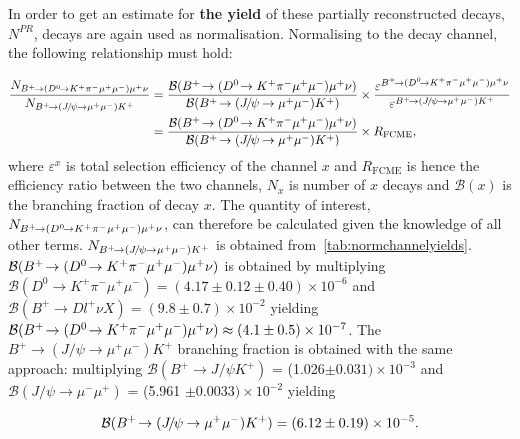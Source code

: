 In order to get an estimate for \textbf{the yield} of these partially reconstructed decays, $N^{PR}$, \bjpsimumuk decays are again used as normalisation. Normalising to the \bjpsimumuk decay channel, the following relationship must hold: 

\begin{equation}
\begin{split}
\frac{N_{\pr}}{N_{\bjpsimumuk}}&= \frac{\mathcal{B}(\pr)}{\mathcal{B}(\bjpsimumuk)} \times \frac{\varepsilon^{\pr}}{\varepsilon^{\bjpsimumuk}} \\
&=\frac{\mathcal{B}(\pr)}{\mathcal{B}(\bjpsimumuk)} \times R_{\mathrm{FCME}},
\end{split}
\end{equation}
	where $\varepsilon^{x}$ is total selection efficiency of the channel $x$ and $R_{\mathrm{FCME}}$ is hence the efficiency ratio between the two channels, $N_{x}$ is number of $x$ decays and $\mathcal{B}(x)$ is the branching fraction of decay $x$. The quantity of interest, $N_{{{{B}^+}}\!\rightarrow ({{D}^0}\!\rightarrow {\ensuremath{{K}^+}}{\ensuremath{{\pi}^-}}{\ensuremath{\mu^+\mu^-}}){\mu^+}\nu}$, can therefore be calculated given the knowledge of all other terms. $N_{{{{B}^+}}\!\rightarrow ({{J\mskip -3mu/\mskip -2mu\psi\mskip 2mu}}\!\rightarrow {\ensuremath{\mu^+\mu^-}}){{K}^+}}$ is obtained from~\autoref{tab:normchannelyields}. $\mathcal{B}({{{B}^+}}\!\rightarrow ({{D}^0}\!\rightarrow {\ensuremath{{K}^+}}{\ensuremath{{\pi}^-}}{\ensuremath{\mu^+\mu^-}}){\mu^+}\nu)$ is obtained by multiplying $\mathcal{B}(D^{0} \rightarrow K^+ \pi^- \mu^+ \mu^{-}) = (4.17\pm0.12\pm0.40)\times 10^{-6}$\cite{Aaij:2015hva} and $\mathcal{B}(B^{+} \rightarrow D l^{+} \nu X) = (9.8 \pm 0.7)\times 10^{-2}$ \cite{Patrignani:2016xqp} yielding $\mathcal{B}({{{B}^+}}\!\rightarrow ({{D}^0}\!\rightarrow {\ensuremath{{K}^+}}{\ensuremath{{\pi}^-}}{\ensuremath{\mu^+\mu^-}}){\mu^+}\nu) \approx (4.1\pm0.5)\times 10 ^{-7 }$. The $B^+ \rightarrow (J/\psi \rightarrow \mu^+ \mu^{-}) K^{+}$ branching fraction is obtained with the same approach: multiplying $\mathcal{B}(B^{+} \rightarrow J/\psi K^{+})$ = (1.026$\pm 0.031)\times 10^{-3}$\cite{Patrignani:2016xqp} and $\mathcal{B}(J/\psi \rightarrow \mu^{-} \mu^{+})$ = (5.961 $\pm0.0033) \times 10^{-2}$\cite{Patrignani:2016xqp} yielding 
	
\begin{equation}
\mathcal{B}({{{B}^+}}\!\rightarrow ({{J\mskip -3mu/\mskip -2mu\psi\mskip 2mu}}\!\rightarrow {\ensuremath{\mu^+\mu^-}}){{K}^+})=(6.12\pm0.19)\times 10^{-5}.
	\label{eq:normeq}
\end{equation}


